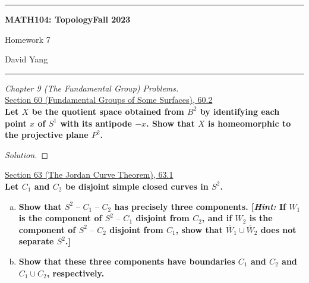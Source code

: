 \documentclass[11pt]{article}
\newenvironment{solution}
  {\renewcommand\qedsymbol{$\blacksquare$}\begin{proof}[Solution]}
  {\end{proof}}
\begin{document}
	\hrule
	\begin{center}
        \textbf{MATH104: Topology}\hfill \textbf{Fall 2023}\newline

		{\Large Homework 7}

		David Yang
	\end{center}

\hrule

\vspace{1em}

\textit{Chapter 9 (The Fundamental Group) Problems.} \\

\underline{Section 60 (Fundamental Groups of Some Surfaces), 60.2} \\

\textbf{Let $X$ be the quotient space obtained from $B^2$ by identifying each point $x$ of $S^1$ with its antipode $-x$. 
Show that $X$ is homeomorphic to the projective plane $P^2$.} 

\begin{solution}

\end{solution}

\underline{Section 63 (The Jordan Curve Theorem), 63.1} \\

\textbf{Let $C_1$ and $C_2$ be disjoint simple closed curves in $S^2$.}

\begin{enumerate}[a)]
    \item \textbf{Show that $S^2 \text{ -- } C_1 \text{ -- } C_2$ has precisely three components. [\textit{Hint:} If $W_1$ is the component
    of $S^2 \text{ -- } C_1$ disjoint from $C_2$, and if $W_2$ is the component of $S^2 \text{ -- } C_2$ disjoint from $C_1$, show that
    $\overline{W}_1 \cup \overline{W}_2$ does not separate $S^2$.]}

    \item \textbf{Show that these three components have boundaries $C_1$ and $C_2$ and $C_1 \cup C_2$, respectively.}
    
\end{enumerate}
\end{document}

